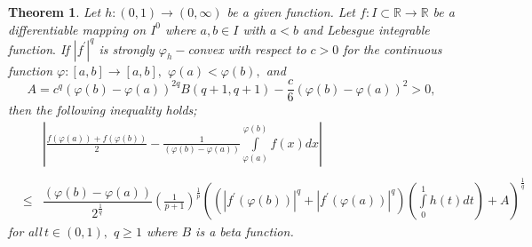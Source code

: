 \documentclass{amsart}
\newtheorem{theorem}{Theorem}
\theoremstyle{plain}
\numberwithin{equation}{section}
\begin{document}
\begin{theorem}
\label{t2} Let $h:\left( 0,1\right) \rightarrow \left( 0,\infty \right) $ be
a given function. Let $f:I\subset 
\mathbb{R}
\rightarrow 
\mathbb{R}
$ be a differentiable mapping on $I^{0}$ where $a,b\in I$ with $a<b$ and
Lebesgue integrable function$.$ If $\left\vert f^{\prime }\right\vert ^{q}$
is strongly $\varphi _{h}-$convex with respect to $c>0$ for the continuous
function $\varphi :\left[ a,b\right] \rightarrow \left[ a,b\right] ,$ $\varphi (a)<\varphi (b),$ and\begin{equation*}
A=c^{q}(\varphi (b)-\varphi (a))^{2q}B(q+1,q+1)-\frac{c}{6}(\varphi
(b)-\varphi (a))^{2}>0,
\end{equation*}then the following inequality holds;\begin{eqnarray*}
&&\left\vert \frac{f\left( \varphi (a)\right) +f\left( \varphi (b)\right) }{2}-\frac{1}{(\varphi (b)-\varphi (a))}\int\limits_{\varphi (a)}^{\varphi
(b)}f\left( x\right) dx\right\vert  \\
&& \\
&\leq &\dfrac{(\varphi (b)-\varphi (a))}{2^{\frac{1}{q}}}\left( \frac{1}{p+1}\right) ^{\frac{1}{p}}\left( \left( \left\vert f^{\prime }(\varphi
(b))\right\vert ^{q}+\left\vert f^{\prime }(\varphi (a))\right\vert
^{q}\right) \left( \int\limits_{0}^{1}h(t)dt\right) +A\right) ^{\frac{1}{q}}
\end{eqnarray*}for all$\ t\in \left( 0,1\right) ,$ $q\geq 1$ where $B$ is a beta function.
\end{theorem}
\end{document}
